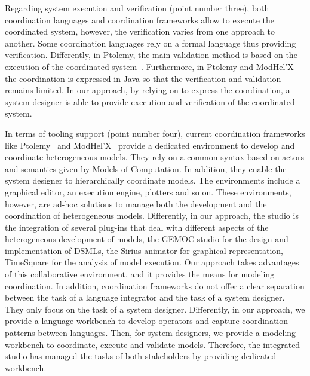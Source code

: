Regarding system execution and verification (point number three), both coordination languages and coordination frameworks allow to execute the coordinated system, however, the verification varies from one approach to another. Some coordination languages rely on a formal language thus providing verification. Differently, in Ptolemy, the main validation method is based on the execution of the coordinated system~\cite{ptoleframebib}. Furthermore, in Ptolemy and ModHel'X the coordination is expressed in Java so that the verification and validation remains limited. In our approach, by relying on \ccsl to express the coordination, a system designer is able to provide execution and verification of the coordinated system.

In terms of tooling support (point number four), current coordination frameworks like Ptolemy~\cite{ptoleframebib} and ModHel'X~\cite{modhelxbib} provide a dedicated environment to develop and coordinate heterogeneous models. They rely on a common syntax based on actors and semantics given by Models of Computation. In addition, they enable the system designer to hierarchically coordinate models. The environments include a graphical editor, an execution engine, plotters and so on. These environments, however, are ad-hoc solutions to manage both the development and the coordination of heterogeneous models. Differently, in our approach, the studio is the integration of several plug-ins that deal with different aspects of the heterogeneous development of models, \eg the GEMOC studio for the design and implementation of DSMLs, the Sirius animator for graphical representation, TimeSquare for the analysis of model execution. Our approach takes advantages of this collaborative environment, and it provides the means for modeling coordination. In addition, coordination frameworks do not offer a clear separation between the task of a language integrator and the task of a system designer. They only focus on the task of a system designer. Differently, in our approach, we provide a language workbench to develop \bcool operators and capture coordination patterns between languages. Then, for system designers, we provide a modeling workbench to coordinate, execute and validate models. Therefore, the integrated studio has managed the tasks of both stakeholders by providing dedicated workbench. 
